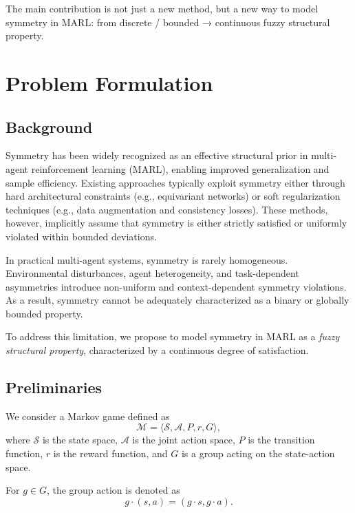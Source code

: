 The main contribution is not just a new method,
but a new way to model symmetry in MARL:
from discrete / bounded → continuous fuzzy structural property.


\section{Problem Formulation}





\subsection{Background}

Symmetry has been widely recognized as an effective structural prior in multi-agent reinforcement learning (MARL), enabling improved generalization and sample efficiency. Existing approaches typically exploit symmetry either through hard architectural constraints (e.g., equivariant networks) or soft regularization techniques (e.g., data augmentation and consistency losses). These methods, however, implicitly assume that symmetry is either strictly satisfied or uniformly violated within bounded deviations.

In practical multi-agent systems, symmetry is rarely homogeneous. Environmental disturbances, agent heterogeneity, and task-dependent asymmetries introduce non-uniform and context-dependent symmetry violations. As a result, symmetry cannot be adequately characterized as a binary or globally bounded property.

To address this limitation, we propose to model symmetry in MARL as a \emph{fuzzy structural property}, characterized by a continuous degree of satisfaction.

\subsection{Preliminaries}

We consider a Markov game defined as
\begin{equation}
\mathcal{M} = \langle \mathcal{S}, \mathcal{A}, P, r, G \rangle,
\end{equation}
where $\mathcal{S}$ is the state space, $\mathcal{A}$ is the joint action space, $P$ is the transition function, $r$ is the reward function, and $G$ is a group acting on the state-action space.

For $g \in G$, the group action is denoted as
\begin{equation}
g \cdot (s, a) = (g \cdot s, g \cdot a).
\end{equation}

